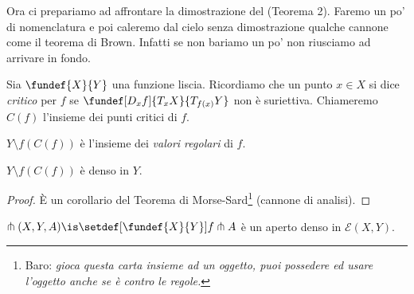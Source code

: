Ora ci prepariamo ad affrontare la dimostrazione del (Teorema 2). Faremo un po' di nomenclatura e poi caleremo dal cielo senza dimostrazione qualche cannone come il teorema di Brown. Infatti se non bariamo un po' non riusciamo ad arrivare in fondo.

\begin{defn} Sia $\fundef{X}{Y}$ una funzione liscia. Ricordiamo che un punto $x \in X$ si dice \emph{critico} per $f$ se $\fundef[D_xf]{T_xX}{T_{f(x)}Y}$ non è suriettiva. Chiameremo $C(f)$ l'insieme dei punti critici di $f$.
\end{defn}

\begin{oss}
$Y \setminus f(C(f))$ è l'insieme dei \emph{valori regolari} di $f$.
\end{oss}

\begin{teo}[Brown]
$Y \setminus f(C(f))$ è denso in $Y$.
\end{teo}

\begin{proof}
È un corollario del Teorema di Morse-Sard\footnote{Baro: \emph{gioca questa carta insieme ad un oggetto, puoi possedere ed usare l'oggetto anche se è contro le regole.}} (cannone di analisi).
\end{proof}

\begin{teo}
$\pitchfork(X,Y,A) \is \setdef[\fundef{X}{Y}]{f \pitchfork A}$ è un aperto denso in $\mathcal{E}(X,Y)$.
\end{teo}

